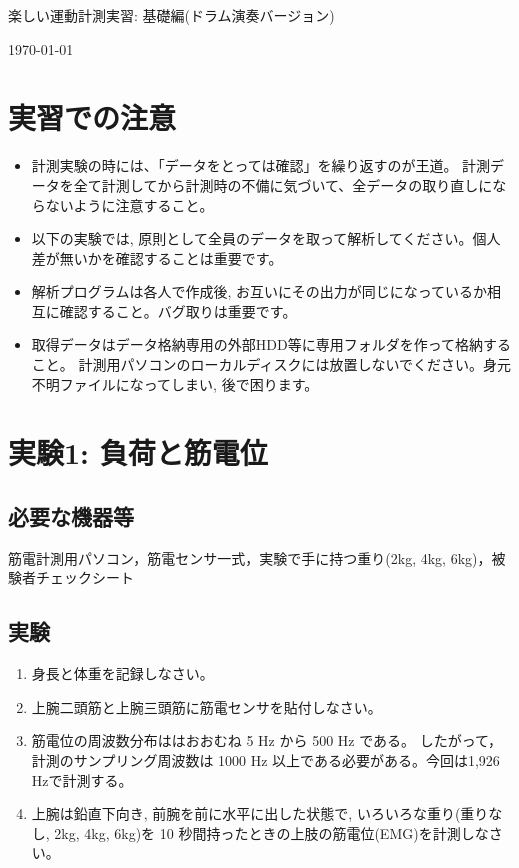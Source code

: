 \documentclass{jsarticle}
\begin{document}
\begin{center}
  {\LARGE 楽しい運動計測実習: 基礎編(ドラム演奏バージョン)}
\end{center}
\begin{flushright}
\today
\end{flushright}

\section*{実習での注意}
\begin{itemize}
\item 計測実験の時には、「データをとっては確認」を繰り返すのが王道。
  計測データを全て計測してから計測時の不備に気づいて、全データの取り直しにならないように注意すること。
\item 以下の実験では, 原則として全員のデータを取って解析してください。個人差が無いかを確認することは重要です。
\item 解析プログラムは各人で作成後, お互いにその出力が同じになっているか相互に確認すること。バグ取りは重要です。
\item 取得データはデータ格納専用の外部HDD等に専用フォルダを作って格納すること。
  計測用パソコンのローカルディスクには放置しないでください。身元不明ファイルになってしまい, 後で困ります。
\end{itemize}

\section{実験1: 負荷と筋電位}

\subsection{必要な機器等}

筋電計測用パソコン，筋電センサ一式，実験で手に持つ重り(2kg, 4kg, 6kg)，被験者チェックシート

\subsection{実験}

\begin{enumerate}
  \item 身長と体重を記録しなさい。
  \item 上腕二頭筋と上腕三頭筋に筋電センサを貼付しなさい。
  \item 筋電位の周波数分布ははおおむね 5 Hz から 500 Hz である。
  したがって，計測のサンプリング周波数は 1000 Hz 以上である必要がある。今回は1,926 Hzで計測する。
  \item 上腕は鉛直下向き, 前腕を前に水平に出した状態で, いろいろな重り(重りなし, 2kg, 4kg, 6kg)を 10 秒間持ったときの上肢の筋電位(EMG)を計測しなさい。
\end{enumerate}  
\end{document}
